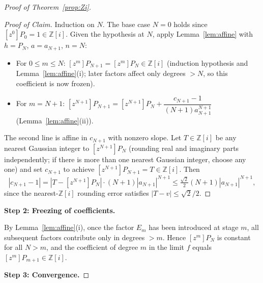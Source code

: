 \documentclass{amsart}
\theoremstyle{definition}
\newcommand{\Zi}{\mathbb{Z}[i]}
\newcommand{\abs}[1]{\left|#1\right|}
\begin{document}
\begin{proof}[Proof of Theorem~\ref{prop:Zi}]
\begin{proof}[Proof of Claim]
Induction on $N$.  The base case $N=0$ holds since $[z^0]P_0 = 1 \in
\Zi$.  Given the hypothesis at $N$, apply Lemma~\ref{lem:affine} with
$h = P_N$, $a = a_{N+1}$, $n = N$:
\begin{itemize}
  \item For $0 \leq m \leq N$: $[z^m]P_{N+1} = [z^m]P_N \in \Zi$
        (induction hypothesis and Lemma~\ref{lem:affine}(i); later
        factors affect only degrees $> N$, so this coefficient is now
        frozen).
  \item For $m = N+1$:
    $[z^{N+1}]P_{N+1} = [z^{N+1}]P_N + \dfrac{c_{N+1}-1}{(N+1)a_{N+1}^{N+1}}$
    (Lemma~\ref{lem:affine}(ii)).
\end{itemize}
The second line is affine in $c_{N+1}$ with nonzero slope.  Let $T \in
\Zi$ be any nearest Gaussian integer to $[z^{N+1}]P_N$ (rounding real
and imaginary parts independently; if there is more than one nearest
Gaussian integer, choose any one) and set
$c_{N+1}$ to achieve $[z^{N+1}]P_{N+1} = T \in \Zi$.  Then
\[
  \abs{c_{N+1}-1}
  = \abs{T - [z^{N+1}]P_N} \cdot (N+1)\abs{a_{N+1}}^{N+1}
  \leq \tfrac{\sqrt{2}}{2}(N+1)\abs{a_{N+1}}^{N+1},
\]
since the nearest-$\Zi$ rounding error satisfies $\abs{T-v} \leq
\sqrt{2}/2$.
\end{proof}

\medskip\noindent\textbf{Step 2: Freezing of coefficients.}

By Lemma~\ref{lem:affine}(i), once the factor $E_m$ has been introduced
at stage $m$, all subsequent factors contribute only in degrees $> m$.
Hence $[z^m]P_N$ is constant for all $N > m$, and the coefficient of
degree $m$ in the limit $f$ equals $[z^m]P_{m+1} \in \Zi$.

\medskip\noindent\textbf{Step 3: Convergence.}


\end{proof}
\end{document}
